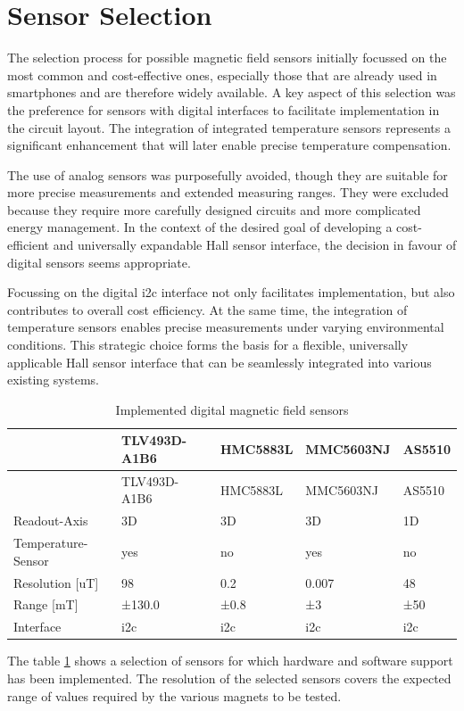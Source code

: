 \hypertarget{sensor-selection}{%
\section{Sensor Selection}\label{sensor-selection}}

The selection process for possible magnetic field sensors initially
focussed on the most common and cost-effective ones, especially those
that are already used in smartphones and are therefore widely available.
A key aspect of this selection was the preference for sensors with
digital interfaces to facilitate implementation in the circuit layout.
The integration of integrated temperature sensors represents a
significant enhancement that will later enable precise temperature
compensation.

The use of analog sensors was purposefully avoided, though they are
suitable for more precise measurements and extended measuring ranges.
They were excluded because they require more carefully designed circuits
and more complicated energy management. In the context of the desired
goal of developing a cost-efficient and universally expandable Hall
sensor interface, the decision in favour of digital sensors seems
appropriate.

Focussing on the digital \gls{i2c} interface not only facilitates
implementation, but also contributes to overall cost efficiency. At the
same time, the integration of temperature sensors enables precise
measurements under varying environmental conditions. This strategic
choice forms the basis for a flexible, universally applicable Hall
sensor interface that can be seamlessly integrated into various existing
systems.

\begin{longtable}[]{@{}lllll@{}}
\caption{Implemented digital magnetic field sensors
\label{Implemented_digital_magnetic_field_sensors.csv}}\tabularnewline
\toprule
& TLV493D-A1B6 & HMC5883L & MMC5603NJ & AS5510\tabularnewline
\midrule
\endfirsthead
\toprule
& TLV493D-A1B6 & HMC5883L & MMC5603NJ & AS5510\tabularnewline
\midrule
\endhead
Readout-Axis & 3D & 3D & 3D & 1D\tabularnewline
Temperature-Sensor & yes & no & yes & no\tabularnewline
Resolution {[}uT{]} & 98 & 0.2 & 0.007 & 48\tabularnewline
Range {[}mT{]} & ±130.0 & ±0.8 & ±3 & ±50\tabularnewline
Interface & \gls{i2c} & \gls{i2c} & \gls{i2c} & \gls{i2c}\tabularnewline
\bottomrule
\end{longtable}

The table \ref{Implemented_digital_magnetic_field_sensors.csv} shows a
selection of sensors for which hardware and software support has been
implemented. The resolution of the selected sensors covers the expected
range of values required by the various magnets to be tested.

